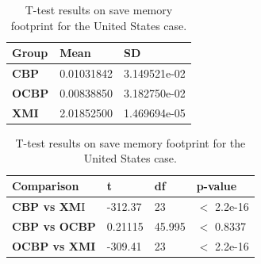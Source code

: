 \documentclass{llncs}
\begin{document}
\begin{table}[ht]
    \centering
    \label{table:ttest_save_memory_wikipedia}
    \caption{T-test results on save memory footprint for the United States case.}
    \begin{minipage}{0.44\textwidth}
        \centering
        \begin{tabular}{|p{}|p{}|p{}|}
            \hline 
            \textbf{Group}  & \textbf{Mean} & \textbf{SD} \\ 
            \hline 
            \textbf{CBP} & 0.01031842     & 3.149521e-02 \\ 
            \hline 
            \textbf{OCBP} & 0.00838850  & 3.182750e-02 \\ 
            \hline 
            \textbf{XMI} &  2.01852500  & 1.469694e-05 \\ 
            \hline 
        \end{tabular} 
    \end{minipage}
    \hfill
    \begin{minipage}{0.54\textwidth}
        \centering
        \begin{tabular}{|p{}|p{}|p{}|p{}|}
            \hline 
            \textbf{Comparison} & \textbf{t}  & \textbf{df} & \textbf{p-value} \\ 
            \hline 
            \textbf{CBP vs XM}I & -312.37   &23 & $<$ 2.2e-16 \\ 
            \hline 
            \textbf{CBP vs OCBP} &0.21115 &45.995 & $<$ 0.8337 \\ 
            \hline 
            \textbf{OCBP vs XMI} &-309.41  &23 & $<$ 2.2e-16 \\ 
            \hline 
        \end{tabular} 
    \end{minipage}
\end{table}
\end{document}
